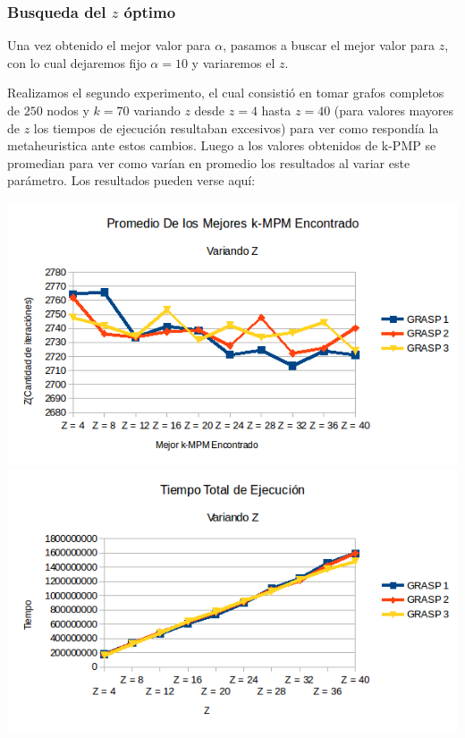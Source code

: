 \subsubsection{Busqueda del $z$ óptimo}

Una vez obtenido el mejor valor para $\alpha$, pasamos a buscar el mejor valor para $z$, con lo cual dejaremos fijo $\alpha=10$ y variaremos el $z$.

Realizamos el segundo experimento, el cual consistió en tomar grafos completos de $250$ nodos y $k = 70$ variando $z$ desde $z = 4$ hasta $z = 40$ (para valores mayores de $z$ los tiempos de ejecución resultaban excesivos) para ver como respondía la metaheuristica ante estos cambios. Luego a los valores obtenidos de k-PMP se promedian para ver como varían en promedio los resultados al variar este parámetro.
Los resultados pueden verse aquí:

\includegraphics[scale=0.7]{Ej5/promedioZ.png}\\

\includegraphics[scale=0.7]{Ej5/tiemposZ.png}\\

